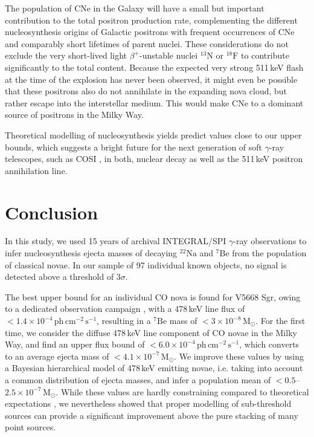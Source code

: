 \documentclass{aa}
\newcommand{\mrm}[1]{\mathrm{#1}}
\newcommand{\nuc}[2]{$\mrm{^{#2}#1}$}
\begin{document}
The population of CNe in the Galaxy will have a small but important contribution to the total positron production rate, complementing the different nucleosynthesis origins of Galactic positrons with frequent occurrences of CNe and comparably short lifetimes of parent nuclei.
%
These considerations do not exclude the very short-lived light $\beta^+$-unstable nuclei \nuc{N}{13} or \nuc{F}{18} to contribute significantly to the total content.
%
Because the expected very strong 511\,keV flash at the time of the explosion has never been observed, it might even be possible that these positrons also do not annihilate in the expanding nova cloud, but rather escape into the interstellar medium.
%
This would make CNe to a dominant source of positrons in the Milky Way.

Theoretical modelling of nucleosynthesis yields predict values close to our upper bounds, which suggests a bright future for the next generation of soft $\gamma$-ray telescopes, such as COSI \citep{Tomsick2019_COSI}, in both, nuclear decay as well as the 511\,keV positron annihilation line.


\section{Conclusion}\label{sec:conclusion}
%
In this study, we used 15 years of archival INTEGRAL/SPI $\gamma$-ray observations to infer nucleosynthesis ejecta masses of decaying \nuc{Na}{22} and \nuc{Be}{7} from the population of classical novae.
%
In our sample of 97 individual known objects, no signal is detected above a threshold of $3\sigma$.

The best upper bound for an individual CO nova is found for V5668 Sgr, owing to a dedicated observation campaign \citep[see][]{Siegert2018_V5668Sgr}, with a 478\,keV line flux of $<1.4 \times 10^{-4}\,\mrm{ph\,cm^{-2}\,s^{-1}}$, resulting in a \nuc{Be}{7} mass of $<3 \times 10^{-8}\,\mrm{M_{\odot}}$.
%
For the first time, we consider the diffuse 478\,keV line component of CO novae in the Milky Way, and find an upper flux bound of $<6.0 \times 10^{-4}\,\mrm{ph\,cm^{-2}\,s^{-1}}$, which converts to an average ejecta mass of $<4.1 \times 10^{-7}\,\mrm{M_{\odot}}$.
%
We improve these values by using a Bayesian hierarchical model of 478\,keV emitting novae, i.e. taking into account a common distribution of ejecta masses, and infer a population mean of $<0.5$--$2.5 \times 10^{-7}\,\mrm{M_{\odot}}$.
%
While these values are hardly constraining compared to theoretical expectations \citep[e.g.,][]{Starrfield2020_COnovae}, we nevertheless showed that proper modelling of sub-threshold sources can provide a significant improvement above the pure stacking of many point sources.
\end{document}
